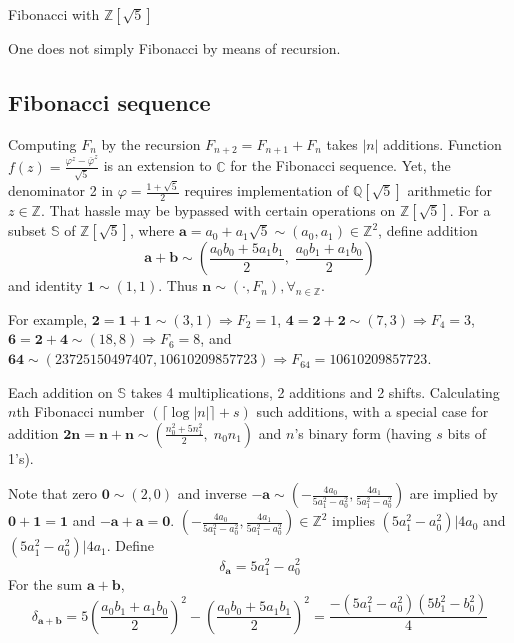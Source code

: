 \documentclass[12pt,letterpaper]{article}
\begin{document}
\newcommand{\pad}{\vspace{12pt}}


\begin{center}
\begin{LARGE}
Fibonacci with $\mathbb{Z}[\sqrt{5}]$
\end{LARGE}

\pad
One does not simply Fibonacci by means of recursion.
\end{center}

\begin{flushleft}

\section{Fibonacci sequence}
Computing $F_n$ by the recursion $F_{n+2} = F_{n+1} + F_n$ takes $|n|$ additions. Function $\displaystyle f(z) = \frac{\varphi^z-\overline{\varphi}^z}{\sqrt{5}}$ is an extension to $\mathbb{C}$ for the Fibonacci sequence. Yet, the denominator 2 in $\displaystyle \varphi = \frac{1+\sqrt{5}}{2}$ requires implementation of $\mathbb{Q}[\sqrt{5}]$ arithmetic for $z \in \mathbb{Z}$. That hassle may be bypassed with certain operations on $\mathbb{Z}[\sqrt{5}]$. For a subset $\mathbb{S}$ of $\mathbb{Z}[\sqrt{5}]$, where $\mathbf{a} = a_0 + a_1 \sqrt{5} \sim \left(a_0, a_1\right) \in \mathbb{Z}^2$, define addition \[ \mathbf{a} + \mathbf{b} \sim \left(\frac{a_0b_0+5a_1b_1}{2},\; \frac{a_0b_1+a_1b_0}{2}\right)\] and identity $\mathbf{1} \sim (1, 1)$. Thus $\mathbf{n} \sim (\cdot, F_n), \forall_{n\in \mathbb{Z}}$. 

\pad
For example, $\mathbf{2} = \mathbf{1} + \mathbf{1} \sim (3, 1) \Rightarrow F_2=1$, $\mathbf{4} = \mathbf{2} + \mathbf{2} \sim (7, 3) \Rightarrow F_4=3$, $\mathbf{6} = \mathbf{2} + \mathbf{4} \sim (18, 8) \Rightarrow F_6=8$, and $\mathbf{64} \sim (23725150497407, 10610209857723) \Rightarrow F_{64}=10610209857723$. 

\pad
Each addition on $\mathbb{S}$ takes 4 multiplications, 2 additions and 2 shifts. Calculating $n$th Fibonacci number $\left(\lceil\log |n|\rceil + s\right)$ such additions, with a special case for addition $\displaystyle  \mathbf{2n} = \mathbf{n}+\mathbf{n} \sim \left(\frac{n_0^2+5n_1^2}{2},\; n_0n_1\right)$ and $n$'s binary form (having $s$ bits of 1's). 

\pad
Note that zero $\mathbf{0} \sim (2, 0)$ and inverse $\displaystyle \mathbf{-a} \sim (-\frac{4a_0}{5a_1^2-a_0^2}, \frac{4a_1}{5a_1^2-a_0^2})$ are implied by $\mathbf{0} + \mathbf{1} = \mathbf{1}$ and $\mathbf{-a} + \mathbf{a} = \mathbf{0}$. $\displaystyle (-\frac{4a_0}{5a_1^2-a_0^2}, \frac{4a_1}{5a_1^2-a_0^2}) \in \mathbb{Z}^2$ implies $(5a_1^2-a_0^2)|4a_0$ and $(5a_1^2-a_0^2)|4a_1$. Define
\[\delta_\mathbf{a}=5a_1^2-a_0^2\]
For the sum $\mathbf{a} + \mathbf{b}$, 
\[\delta_\mathbf{a+b}=5\left(\frac{a_0b_1+a_1b_0}{2}\right)^2-\left(\frac{a_0b_0+5a_1b_1}{2}\right)^2=\frac{-\left(5a_1^2-a_0^2\right)\left(5b_1^2-b_0^2\right)}{4}\]


\end{flushleft}
\end{document}
